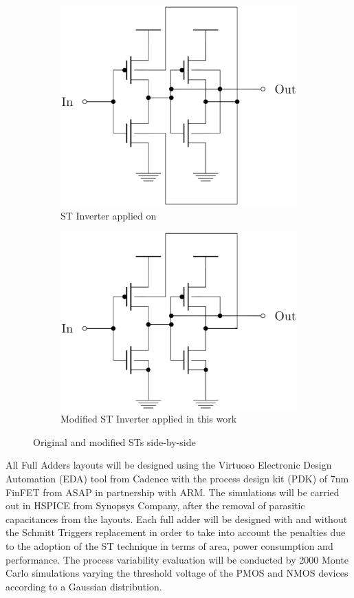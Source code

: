\documentclass[ecp,tc, english]{iiufrgs}
\begin{document}
\begin{figure}[ht]
\centering
\begin{subfigure}{.5\textwidth}
  \centering
  \includegraphics[width=.8\linewidth]{STOriginal.eps}
  \caption{ST Inverter applied on \citet{dokania2015circuit}}
  \label{fig:sub1}
\end{subfigure}%
\begin{subfigure}{.5\textwidth}
  \centering
  \includegraphics[width=.8\linewidth]{STcorrigido.eps}
  \caption{Modified ST Inverter applied in this work}
  \label{fig:sub2}
\end{subfigure}
\caption{Original and modified STs side-by-side}
\label{fig:test}
\end{figure}

All Full Adders layouts will be designed using the Virtuoso Electronic Design Automation (EDA) tool from Cadence\textregistered{} with the process design kit (PDK) of 7nm FinFET from ASAP in partnership with ARM. The simulations will be carried out in HSPICE from Synopsys Company, after the removal of parasitic capacitances from the layouts. Each full adder will be designed with and without the Schmitt Triggers replacement in order to take into account the penalties due to the adoption of the ST technique in terms of area, power consumption and performance. The process variability evaluation will be conducted by 2000 Monte Carlo simulations varying the threshold voltage of the PMOS and NMOS devices according to a Gaussian distribution.
\end{document}
